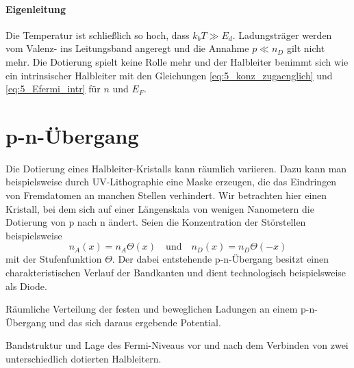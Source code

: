 \paragraph*{Eigenleitung} Die Temperatur ist schließlich so hoch, dass $k_b T \gg E_d$. Ladungsträger werden vom Valenz- ins Leitungsband angeregt und die Annahme $p \ll n_D$ gilt nicht mehr. Die Dotierung spielt keine Rolle mehr und der Halbleiter benimmt sich wie ein intrinsischer Halbleiter mit den Gleichungen  \ref{eq:5_konz_zugaenglich} und  \ref{eq:5_Efermi_intr} für $n$ und $E_F$.


\section{p-n-Übergang}

Die Dotierung eines Halbleiter-Kristalls kann räumlich variieren. Dazu kann man beispielsweise durch UV-Lithographie eine Maske erzeugen, die das Eindringen von Fremdatomen an manchen Stellen verhindert. Wir betrachten hier einen Kristall, bei dem sich auf einer Längenskala von wenigen Nanometern die Dotierung von p nach n ändert.  Seien die Konzentration der Störstellen beispielsweise
\begin{equation}
    n_A(x) = n_A \Theta(x) \quad \text{und}  \quad  n_D(x) = n_D \Theta(-x) 
\end{equation}
mit der Stufenfunktion $\Theta$. Der dabei entstehende p-n-Übergang besitzt einen charakteristischen Verlauf der Bandkanten und dient technologisch beispielsweise als Diode.


\begin{marginfigure}[-110mm]
    \caption{Räumliche Verteilung der festen und beweglichen Ladungen an einem p-n-Übergang und das sich daraus ergebende Potential.}
\end{marginfigure}

\begin{marginfigure}[-10mm]
    \caption{Bandstruktur und Lage des Fermi-Niveaus vor und nach dem Verbinden  von zwei unterschiedlich dotierten Halbleitern.}
\end{marginfigure}

